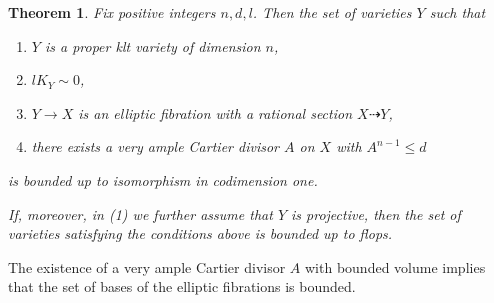 \documentclass[11pt]{ip-journal}
\newtheorem{theorem}{Theorem}[section]
\theoremstyle{definition}
\begin{document}
\begin{theorem}
\label{ell.cy.bound.base.thm}
Fix positive integers $n, d, l$.
Then the set of varieties $Y$ such that
\begin{enumerate}
    \item $Y$ is a proper klt variety of dimension $n$,
    \item $lK_Y \sim 0$,
    \item $Y \to X$ is an elliptic fibration with a rational section $X \dashrightarrow Y$, 
    \item there exists a very ample Cartier divisor $A$ on $X$ with $A^{n-1} \leq d$
\end{enumerate}
is bounded up to isomorphism in codimension one.

If, moreover, in (1) we further assume that 
$Y$ 
is projective, 
then the set of varieties satisfying the conditions above is bounded up to flops.
\end{theorem}

The existence of a very ample Cartier divisor $A$ with bounded volume implies that the set of bases of the elliptic fibrations is bounded.
\end{document}

